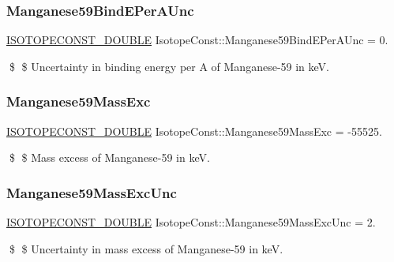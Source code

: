 \subsubsection{\texorpdfstring{Manganese59\+Bind\+E\+Per\+A\+Unc}{Manganese59BindEPerAUnc}}
{\footnotesize\ttfamily \mbox{\hyperlink{group___isotope_const-_macros_ga8f45a7272ce02c0b4c65c44636ed719a}{I\+S\+O\+T\+O\+P\+E\+C\+O\+N\+S\+T\+\_\+\+D\+O\+U\+B\+LE}} Isotope\+Const\+::\+Manganese59\+Bind\+E\+Per\+A\+Unc = 0.}

\$ \$ Uncertainty in binding energy per A of Manganese-\/59 in keV. \mbox{\label{group___isotope_const-_manganese-_mn59_ga9f810a193ff8f744a0e509475e90a811}} 
\subsubsection{\texorpdfstring{Manganese59\+Mass\+Exc}{Manganese59MassExc}}
{\footnotesize\ttfamily \mbox{\hyperlink{group___isotope_const-_macros_ga8f45a7272ce02c0b4c65c44636ed719a}{I\+S\+O\+T\+O\+P\+E\+C\+O\+N\+S\+T\+\_\+\+D\+O\+U\+B\+LE}} Isotope\+Const\+::\+Manganese59\+Mass\+Exc = -\/55525.}

\$ \$ Mass excess of Manganese-\/59 in keV. \mbox{\label{group___isotope_const-_manganese-_mn59_ga5f2e11530bda35640e4ef602b3a49bd4}} 
\subsubsection{\texorpdfstring{Manganese59\+Mass\+Exc\+Unc}{Manganese59MassExcUnc}}
{\footnotesize\ttfamily \mbox{\hyperlink{group___isotope_const-_macros_ga8f45a7272ce02c0b4c65c44636ed719a}{I\+S\+O\+T\+O\+P\+E\+C\+O\+N\+S\+T\+\_\+\+D\+O\+U\+B\+LE}} Isotope\+Const\+::\+Manganese59\+Mass\+Exc\+Unc = 2.}

\$ \$ Uncertainty in mass excess of Manganese-\/59 in keV. \mbox{\label{group___isotope_const-_manganese-_mn59_ga79721f27a499c601e86bd31223d1fd9f}} 
